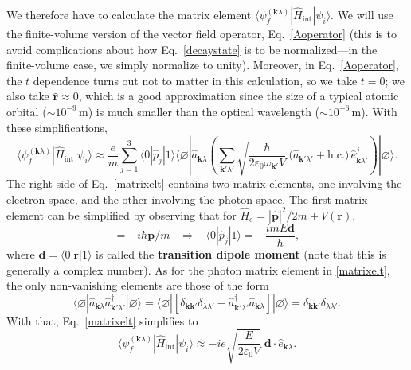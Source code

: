 \documentclass[pra,12pt]{revtex4}
\begin{document}
We therefore have to calculate the matrix element $\langle
\psi_{f}^{(\mathbf{k}\lambda)}| \hat{H}_{\mathrm{int}}|\psi_i\rangle$.
We will use the finite-volume version of the vector field operator,
Eq.~\eqref{Aoperator} (this is to avoid complications about how
Eq.~\eqref{decaystate} is to be normalized---in the finite-volume
case, we simply normalize to unity).  Moreover, in
Eq.~\eqref{Aoperator}, the $t$ dependence turns out not to matter in
this calculation, so we take $t = 0$; we also take $\hat{\mathbf{r}}
\approx 0$, which is a good approximation since the size of a typical
atomic orbital ($\sim 10^{-9}\,\textrm{m}$) is much smaller than the
optical wavelength ($\sim 10^{-6}\,\textrm{m}$).  With these
simplifications,
\begin{equation}
  \langle \psi_{f}^{(\mathbf{k}\lambda)}| \hat{H}_{\mathrm{int}}|\psi_i\rangle
  \approx \frac{e}{m} \sum_{j=1}^3 \langle 0 |\hat{p}_j|1\rangle
  \langle \varnothing| \hat{a}_{\mathbf{k}\lambda}
\left(\sum_{\mathbf{k}'\lambda'} 
  \sqrt{\frac{\hbar}{2\varepsilon_0\omega_{\mathbf{k}'}V}}\,
  \Big(\hat{a}_{\mathbf{k}'\lambda'} + \mathrm{h.c.}\Big)
  \, \hat{e}_{\mathbf{k}\lambda'}^j\right)
  |\varnothing \rangle.
  \label{matrixelt}
\end{equation}
The right side of Eq.~\eqref{matrixelt} contains two matrix elements,
one involving the electron space, and the other involving the photon
space.  The first matrix element can be simplified by observing that
for $\hat{H}_e = |\hat{\mathbf{p}}|^2/2m + V(\mathbf{r})$,
\begin{equation}
  [\hat{H}_e, \hat{\mathbf{r}}] = -i\hbar\mathbf{p}/m \;\;\;\Rightarrow \;\;\;
  \langle 0|\hat{p}_j|1\rangle = - \frac{imE \mathbf{d}}{\hbar},
\end{equation}
where $\mathbf{d} = \langle 0 |\mathbf{r} | 1\rangle$ is called the
\textbf{transition dipole moment} (note that this is generally a
complex number).  As for the photon matrix element in
\eqref{matrixelt}, the only non-vanishing elements are those of the
form
\begin{equation*}
  \langle\varnothing|\hat{a}_{\mathbf{k}\lambda} \hat{a}_{\mathbf{k}'\lambda'}^\dagger|\varnothing\rangle
  = 
  \langle\varnothing| \left[\delta_{\mathbf{k}\mathbf{k}'} \delta_{\lambda\lambda'} - \hat{a}_{\mathbf{k}'\lambda'}^\dagger \hat{a}_{\mathbf{k}\lambda}\right]|\varnothing\rangle =
  \delta_{\mathbf{k}\mathbf{k}'} \delta_{\lambda\lambda'}.
\end{equation*}
With that, Eq.~\eqref{matrixelt} simplifies to
\begin{equation}
  \langle \psi_{f}^{(\mathbf{k}\lambda)}| \hat{H}_{\mathrm{int}}|\psi_i\rangle
  \approx - ie \sqrt{\frac{E}{2\varepsilon_0V}}\;
  \mathbf{d}\cdot \hat{e}_{\mathbf{k}\lambda}.
\end{equation}
\end{document}
